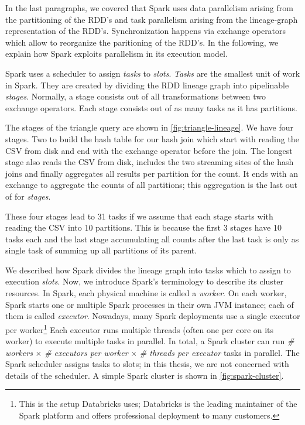 In the last paragraphs, we covered that Spark uses data parallelism arising from the partitioning of the RDD's
and task parallelism arising from the lineage-graph representation of the RDD's.
Synchronization happens via exchange operators which allow to reorganize the paritioning of the RDD's.
In the following, we explain how Spark exploits parallelism in its execution model.

Spark uses a scheduler to assign \textit{tasks} to \textit{slots}.
\textit{Tasks} are the smallest unit of work in Spark.
They are created by dividing the RDD lineage graph into pipelinable \textit{stages}.
Normally, a stage consists out of all transformations between two exchange operators.
Each stage consists out of as many tasks as it has partitions.

The stages of the triangle query are shown in \cref{fig:triangle-lineage}.
We have four stages.
Two to build the hash table for our hash join which start with reading the CSV from disk and end with the exchange operator before
the join.
The longest stage also reads the CSV from disk, includes the two streaming sites of the hash joins and finally aggregates all
results per partition for the count.
It ends with an exchange to aggregate the counts of all partitions; this aggregation is the last out of for \textit{stages}.

These four stages lead to 31 tasks if we assume that each stage starts with reading the CSV into 10 partitions.
This is because the first 3 stages have 10 tasks each and the last stage accumulating all counts after the last task is only as single
task of summing up all partitions of its parent.

We described how Spark divides the lineage graph into tasks which to assign to execution \textit{slots}.
Now, we introduce Spark's terminology to describe its cluster resources.
In Spark, each physical machine is called a \textit{worker}.
On each worker, Spark starts one or multiple Spark processes in their own JVM instance; each of them is called \textit{executor}.
Nowadays, many Spark deployments use a single executor per worker\footnote{This is the setup Databricks uses; Databricks is the leading
maintainer of the Spark platform and offers professional deployment to many customers.}
Each executor runs multiple threads (often one per core on its worker) to execute multiple tasks in parallel.
In total, a Spark cluster can run \textit{\# workers} $\times$ \textit{\# executors per worker} $\times$ \textit{\# threads per executor} tasks
in parallel.
The Spark scheduler assigns tasks to slots;
in this thesis, we are not concerned with details of the scheduler.
A simple Spark cluster is shown in \cref{fig:spark-cluster}.

